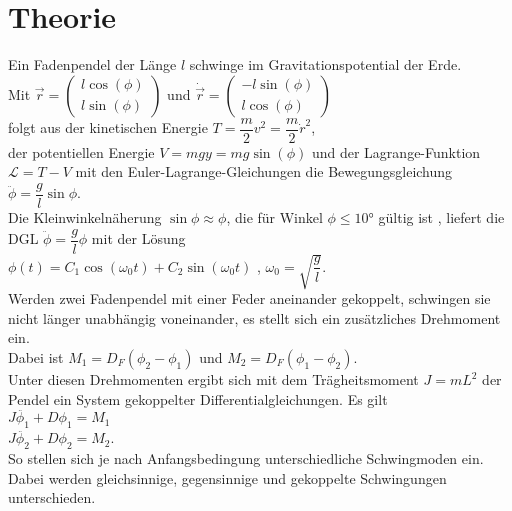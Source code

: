 \section{Theorie}
\label{sec:Theorie}
Ein Fadenpendel der Länge $l$ schwinge im Gravitationspotential der Erde. \\ 

Mit $\vec{r} = \left(\begin{array}{c} l \cos(\phi) \\ l \sin(\phi) \end{array} \right)$ und $\dot{\vec{r}} =\left(\begin{array}{c} -l \sin(\phi) \\ l \cos(\phi) \end{array} \right)$ \\

folgt aus der kinetischen Energie $T = \dfrac{m}{2} v^2 = \dfrac{m}{2} \dot{r}^2$, \\
der potentiellen Energie $V = mgy = mg\sin(\phi)$ und der Lagrange-Funktion $\mathscr{L} = T - V$ mit den Euler-Lagrange-Gleichungen die Bewegungsgleichung \\

$\ddot{\phi} = \dfrac{g}{l}\sin{\phi}$. \\

Die Kleinwinkelnäherung $\sin{\phi} \approx \phi$, die für Winkel $\phi \leq 10°$ gültig ist \cite{wiki:xxx}, liefert die DGL $\ddot{\phi} = \dfrac{g}{l}\phi$ mit der Lösung \\ 
$\phi(t) = C_1 \cos(\omega_0t) + C_2 \sin(\omega_0t)$ , $\omega_0=\sqrt{\dfrac{g}{l}}$. \\

Werden zwei Fadenpendel mit einer Feder aneinander gekoppelt, schwingen sie nicht länger unabhängig voneinander, es stellt sich ein zusätzliches Drehmoment ein. \\

Dabei ist $M_1=D_F(\phi_2-\phi_1)$ und $M_2=D_F(\phi_1-\phi_2)$. \\

Unter diesen Drehmomenten ergibt sich mit dem Trägheitsmoment $J=mL^2$ der Pendel ein System gekoppelter Differentialgleichungen. Es gilt\\

$J\ddot{\phi_1} + D\phi_1 = M_1$ \\

$J\ddot{\phi_2} + D\phi_2 = M_2$. \\

So stellen sich je nach Anfangsbedingung unterschiedliche Schwingmoden ein. Dabei werden gleichsinnige, gegensinnige und gekoppelte Schwingungen unterschieden. \\

